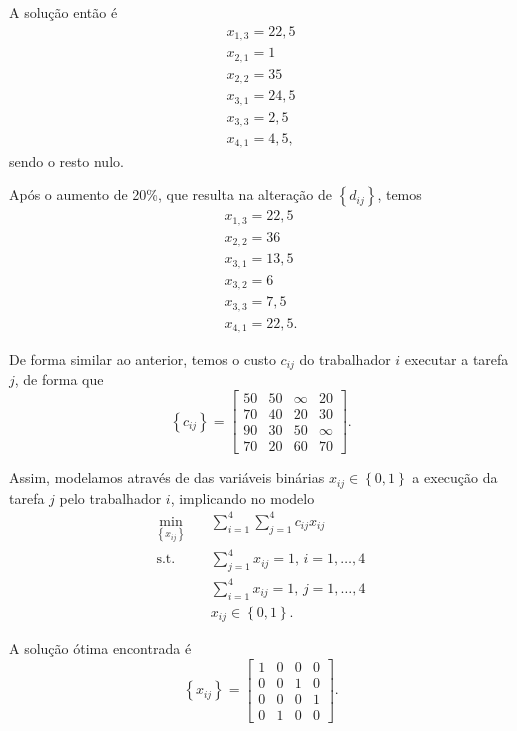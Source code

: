 \documentclass[a4paper]{report}
\begin{document}
A solução então é
\begin{align*}
    x_{1,3} = 22,5 \\
    x_{2,1} = 1 \\
    x_{2,2} = 35 \\
    x_{3,1} = 24,5 \\
    x_{3,3} = 2,5 \\
    x_{4,1} = 4,5
,\end{align*}
sendo o resto nulo.

Após o aumento de 20\%, que resulta na alteração de $\left\{ d_{ij} \right\} $, temos
\begin{align*}
    x_{1,3} = 22,5 \\
    x_{2,2} = 36 \\
    x_{3,1} = 13,5 \\
    x_{3,2} = 6 \\
    x_{3,3} = 7,5 \\
    x_{4,1} = 22,5
.\end{align*}



De forma similar ao anterior, temos o custo $c_{ij}$ do trabalhador $i$ executar a tarefa $j$, de forma que \[
\left\{ c_{ij} \right\} = \begin{bmatrix} 
    50 & 50 & \infty & 20 \\
    70 & 40 & 20 & 30 \\
    90 & 30 & 50 & \infty \\
    70 & 20 & 60 & 70
\end{bmatrix} 
.\]

Assim, modelamos através de das variáveis binárias $x_{ij} \in \left\{ 0,1 \right\} $ a execução da tarefa $j$ pelo trabalhador $i$, implicando no modelo
\begin{align*}
    \min_{\left\{ x_{ij} \right\} } \quad & \sum_{i=1}^{4} \sum_{j=1}^{4} c_{ij}x_{ij} \\
    \textrm{s.t.} \quad & \sum_{j=1}^{4} x_{ij} = 1,\, i=1,\ldots,4\\
      & \sum_{i=1}^{4} x_{ij} = 1,\, j=1,\ldots,4 \\
      & x_{ij} \in \left\{ 0,1 \right\} 
.\end{align*}

A solução ótima encontrada é \[
\left\{ x_{ij} \right\} = \begin{bmatrix} 
    1 & 0 & 0 & 0 \\
    0 & 0 & 1 & 0 \\
    0 & 0 & 0 & 1 \\
    0 & 1 & 0 & 0
\end{bmatrix} 
.\] 
\end{document}
